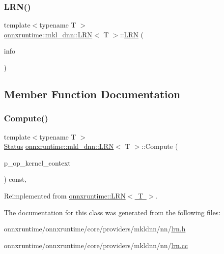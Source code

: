 \subsubsection{\texorpdfstring{L\+R\+N()}{LRN()}}
{\footnotesize\ttfamily template$<$typename T $>$ \\
\mbox{\hyperlink{classonnxruntime_1_1mkl__dnn_1_1LRN}{onnxruntime\+::mkl\+\_\+dnn\+::\+L\+RN}}$<$ T $>$\+::\mbox{\hyperlink{classonnxruntime_1_1mkl__dnn_1_1LRN}{L\+RN}} (\begin{DoxyParamCaption}\item[{const \mbox{\hyperlink{classonnxruntime_1_1OpKernelInfo}{Op\+Kernel\+Info}} \&}]{info }\end{DoxyParamCaption})\hspace{0.3cm}{\ttfamily [inline]}}



\subsection{Member Function Documentation}
\mbox{\label{classonnxruntime_1_1mkl__dnn_1_1LRN_a8167c16afafb252e4c04542b0b37c3f2}} 
\subsubsection{\texorpdfstring{Compute()}{Compute()}}
{\footnotesize\ttfamily template$<$typename T $>$ \\
\mbox{\hyperlink{classonnxruntime_1_1common_1_1Status}{Status}} \mbox{\hyperlink{classonnxruntime_1_1mkl__dnn_1_1LRN}{onnxruntime\+::mkl\+\_\+dnn\+::\+L\+RN}}$<$ T $>$\+::Compute (\begin{DoxyParamCaption}\item[{\mbox{\hyperlink{classonnxruntime_1_1OpKernelContext}{Op\+Kernel\+Context}} $\ast$}]{p\+\_\+op\+\_\+kernel\+\_\+context }\end{DoxyParamCaption}) const\hspace{0.3cm}{\ttfamily [override]}, {\ttfamily [virtual]}}



Reimplemented from \mbox{\hyperlink{classonnxruntime_1_1LRN_ada28bb5cd885b738d8ed17e738a35ed7}{onnxruntime\+::\+L\+R\+N$<$ T $>$}}.



The documentation for this class was generated from the following files\+:\begin{DoxyCompactItemize}
\item 
onnxruntime/onnxruntime/core/providers/mkldnn/nn/\mbox{\hyperlink{mkldnn_2nn_2lrn_8h}{lrn.\+h}}\item 
onnxruntime/onnxruntime/core/providers/mkldnn/nn/\mbox{\hyperlink{mkldnn_2nn_2lrn_8cc}{lrn.\+cc}}\end{DoxyCompactItemize}
